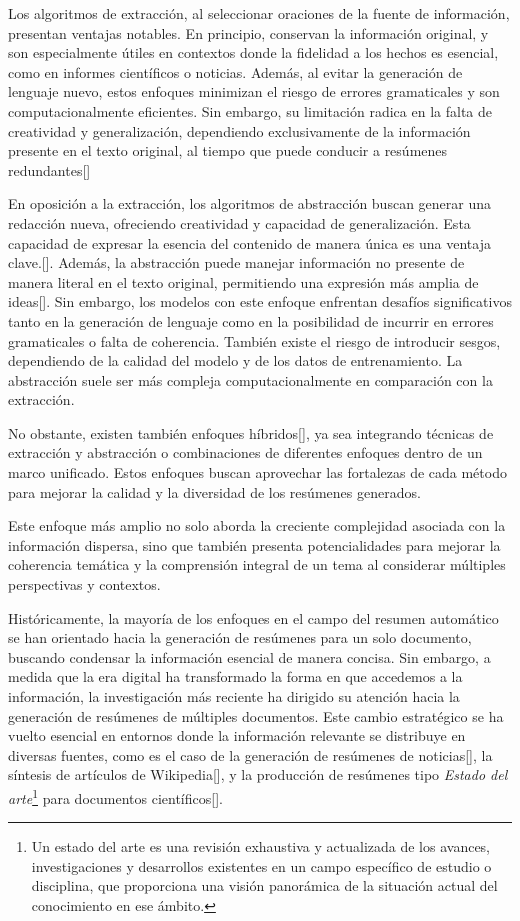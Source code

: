     Los algoritmos de extracción, al seleccionar oraciones de la fuente de información, presentan ventajas notables. En principio, conservan la información original, y son especialmente útiles en contextos donde la fidelidad a los hechos es esencial, como en informes científicos o noticias. Además, al evitar la generación de lenguaje nuevo, estos enfoques minimizan el riesgo de errores gramaticales y son computacionalmente eficientes. Sin embargo, su limitación radica en la falta de creatividad y generalización, dependiendo exclusivamente de la información presente en el texto original, al tiempo que puede conducir a resúmenes redundantes[\cite{LexRank}]

    En oposición a la extracción, los algoritmos de abstracción buscan generar una redacción nueva, ofreciendo creatividad y capacidad de generalización. Esta capacidad de expresar la esencia del contenido de manera única es una ventaja clave.[\cite{rush2015neural}]. Además, la abstracción puede manejar información no presente de manera literal en el texto original, permitiendo una expresión más amplia de ideas[\cite{PaulusXS17}]. Sin embargo, los modelos con este enfoque enfrentan desafíos significativos tanto en la generación de lenguaje como en la posibilidad de incurrir en errores gramaticales o falta de coherencia. También existe el riesgo de introducir sesgos, dependiendo de la calidad del modelo y de los datos de entrenamiento. La abstracción suele ser más compleja computacionalmente en comparación con la extracción.

    No obstante, existen también enfoques híbridos[\cite{SeeLM17}], ya sea integrando técnicas de extracción y abstracción o  combinaciones de diferentes enfoques dentro de un marco unificado. Estos enfoques buscan aprovechar las fortalezas de cada método para mejorar la calidad y la diversidad de los resúmenes generados.

    Este enfoque más amplio no solo aborda la creciente complejidad asociada con la información dispersa, sino que también presenta potencialidades para mejorar la coherencia temática y la comprensión integral de un tema al considerar múltiples perspectivas y contextos.

    Históricamente, la mayoría de los enfoques en el campo del resumen automático se han orientado hacia la generación de resúmenes para un solo documento, buscando condensar la información esencial de manera concisa. Sin embargo, a medida que la era digital ha transformado la forma en que accedemos a la información, la investigación más reciente ha dirigido su atención hacia la generación de resúmenes de múltiples documentos. Este cambio estratégico se ha vuelto esencial en entornos donde la información relevante se distribuye en diversas fuentes, como es el caso de la generación de resúmenes de noticias[\cite{fabbri2019multi-news}], la síntesis de artículos de Wikipedia[\cite{liu2018}], y la producción de resúmenes tipo \emph{Estado del arte}\footnote{Un estado del arte es una revisión exhaustiva y actualizada de los avances, investigaciones y desarrollos existentes en un campo específico de estudio o disciplina, que proporciona una visión panorámica de la situación actual del conocimiento en ese ámbito. } para documentos científicos[\cite{lu2020multixscience}].

